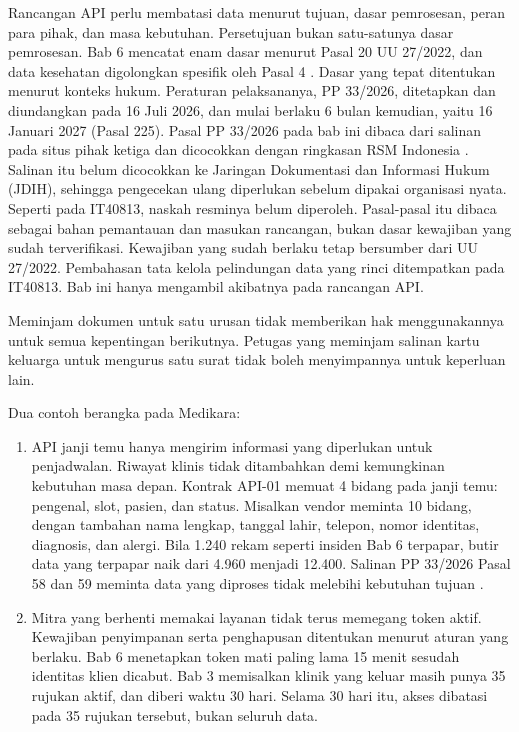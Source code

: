 Rancangan API perlu membatasi data menurut tujuan, dasar pemrosesan, peran para pihak, dan masa kebutuhan. Persetujuan bukan satu-satunya dasar pemrosesan. Bab 6 mencatat enam dasar menurut Pasal 20 UU 27/2022, dan data kesehatan digolongkan spesifik oleh Pasal 4 \cite{uu27-2022-pdp}. Dasar yang tepat ditentukan menurut konteks hukum. Peraturan pelaksananya, PP 33/2026, ditetapkan
dan diundangkan pada 16 Juli 2026, dan mulai berlaku 6 bulan kemudian, yaitu 16 Januari 2027 (Pasal 225). Pasal PP 33/2026 pada bab ini dibaca dari salinan pada situs pihak ketiga dan dicocokkan dengan ringkasan RSM Indonesia \cite{c13-pp33-2026, c13-rsm-pp33}. Salinan itu belum dicocokkan ke Jaringan Dokumentasi dan Informasi Hukum (JDIH), sehingga pengecekan ulang diperlukan sebelum dipakai organisasi nyata. Seperti pada IT40813, naskah resminya belum diperoleh. Pasal-pasal itu dibaca sebagai bahan pemantauan dan masukan rancangan, bukan dasar kewajiban yang sudah terverifikasi. Kewajiban yang sudah berlaku tetap bersumber dari UU 27/2022.
Pembahasan tata kelola pelindungan data yang rinci ditempatkan pada IT40813. Bab ini hanya mengambil akibatnya pada rancangan API.

Meminjam dokumen untuk satu urusan tidak memberikan hak menggunakannya untuk semua kepentingan berikutnya. Petugas yang meminjam salinan kartu keluarga untuk mengurus satu surat tidak boleh menyimpannya untuk keperluan lain.

Dua contoh berangka pada Medikara:
\begin{enumerate}
  \item API janji temu hanya mengirim informasi yang diperlukan untuk penjadwalan. Riwayat klinis tidak ditambahkan demi kemungkinan kebutuhan masa depan. Kontrak API-01 memuat 4 bidang pada janji temu: pengenal, slot, pasien, dan status. Misalkan vendor meminta 10 bidang, dengan tambahan nama lengkap, tanggal lahir, telepon,
        nomor identitas, diagnosis, dan alergi. Bila 1.240 rekam seperti insiden Bab 6 terpapar, butir data yang terpapar naik dari 4.960 menjadi 12.400. Salinan PP 33/2026 Pasal 58 dan 59 meminta data yang diproses tidak melebihi kebutuhan tujuan \cite{c13-pp33-2026}.
  \item Mitra yang berhenti memakai layanan tidak terus memegang token aktif. Kewajiban penyimpanan serta penghapusan ditentukan menurut aturan yang berlaku. Bab 6 menetapkan token mati paling lama 15 menit sesudah identitas klien dicabut. Bab 3 memisalkan klinik yang keluar masih punya 35 rujukan aktif, dan diberi waktu 30 hari.
        Selama 30 hari itu, akses dibatasi pada 35 rujukan tersebut, bukan seluruh data.
\end{enumerate}

